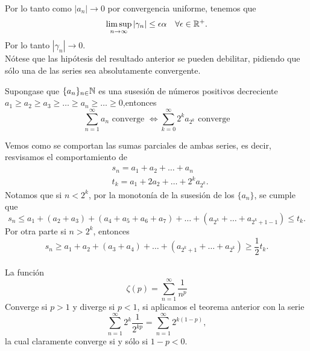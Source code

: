 \documentclass[main.tex]{subfiles}
\begin{document}
\noindent Por lo tanto como \(|a_n|\to0\) por convergencia uniforme, tenemos que
\[
\limsup_{n\to\infty} |\gamma_n|\leq\epsilon\alpha\quad\forall\epsilon\in\mathbb R ^{+}.
\]
\noindent Por lo tanto \(|\gamma_n|\to0\).\QED\\
\obs Nótese que las hipótesis del resultado anterior se pueden debilitar, pidiendo que sólo una de las series sea absolutamente convergente.
\begin{teorema}
Supongase que \(\{a_n\}_{n\in} \mathbb N \) es una susesión de números positivos decreciente \(a_1\geq a_2\geq a_3\geq\dots\geq a_n\geq\dots\geq0\),entonces
\[
\sum_{n=1}^\infty a_n\text{ converge }\iff  \sum_{k=0}^\infty 2^ka_{2^k}\text{ converge}
\]
\end{teorema}
\dem Vemos como se comportan las sumas parciales de ambas series, es decir, resvisamos el comportamiento de
\begin{align*}
&s_n=a_1+a_2+\dots+a_n\\
&t_k=a_1+2a_2+\dots+2^ka_{2^k}.
\end{align*}
\noindent Notamos que si \(n<2^k\), por la monotonía de la susesión de los \(\{a_n\}\), se cumple que
\[s_n\leq a_1 + (a_2+a_3)+(a_4+a_5+a_6+a_7)+\dots+(a_{2^k}+\dots+a_{2^k+1-1})\leq t_k.\]
Por otra parte si \(n>2^k\), entonces
\[s_n\geq a_1 + a_2+(a_3+a_4)+\dots+(a_{2^k+1}+\dots+a_{2^k})\geq\frac{1}{2} t_k.\]
\QED\\
\eje La función
\[
\zeta(p)=\sum_{n=1}^{\infty}\frac{1}{n^p}
\]
Converge si \(p>1\) y diverge si \(p<1\), si aplicamos el teorema anterior con la serie
\[
\sum_{n=1}^{\infty}2^k\frac{1}{2^{kp}}=\sum_{n=1}^{\infty}2^{k(1-p)},
\]
\noindent la cual claramente converge si y sólo si \(1-p<0\).
\end{document}
